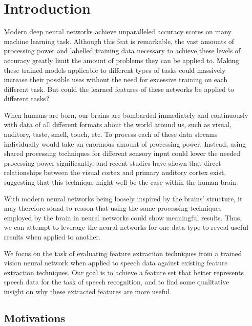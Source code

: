 \graphicspath{{introduction/fig/}}

\chapter{Introduction}
\label{chap:introduction}

Modern deep neural networks achieve unparalleled accuracy scores on many machine learning task.
Although this feat is remarkable, the vast amounts of processing power and labelled training data necessary to achieve these levels of accuracy greatly limit the amount of problems they can be applied to.
Making these trained models applicable to different types of tasks could massively increase their possible uses without the need for excessive training on each different task.
But could the learned features of these networks be applied to different tasks?

When humans are born, our brains are bombarded immediately and continuously with data of all different formats about the world around us, such as visual, auditory, taste, smell, touch, etc.
To process each of these data streams individually would take an enormous amount of processing power.
Instead, using shared processing techniques for different sensory input could lower the needed processing power significantly, and recent studies have shown that direct relationships between the visual cortex and primary auditory cortex exist\cite{doi:10.1002/hbm.20560}, suggesting that this technique might well be the case within the human brain.

With modern neural networks being loosely inspired by the brains' structure, it may therefore stand to reason that using the same processing techniques employed by the brain in neural networks could show meaningful results.
Thus, we can attempt to leverage the neural networks for one data type to reveal useful results when applied to another. 

We focus on the task of evaluating feature extraction techniques from a trained vision neural network when applied to speech data against existing feature extraction techniques.
Our goal is to achieve a feature set that better represents speech data for the task of speech recognition, and to find some qualitative insight on why these extracted features are more useful. 

\section{Motivations}

